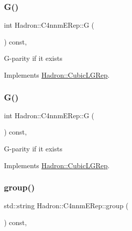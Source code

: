 \subsubsection{\texorpdfstring{G()}{G()}\hspace{0.1cm}{\footnotesize\ttfamily [2/3]}}
{\footnotesize\ttfamily int Hadron\+::\+C4nnm\+E\+Rep\+::G (\begin{DoxyParamCaption}{ }\end{DoxyParamCaption}) const\hspace{0.3cm}{\ttfamily [inline]}, {\ttfamily [virtual]}}

G-\/parity if it exists 

Implements \mbox{\hyperlink{structHadron_1_1CubicLGRep_ace26f7b2d55e3a668a14cb9026da5231}{Hadron\+::\+Cubic\+L\+G\+Rep}}.

\mbox{\label{structHadron_1_1C4nnmERep_aeebb3eed0a37633aded692d6d5929f84}} 
\subsubsection{\texorpdfstring{G()}{G()}\hspace{0.1cm}{\footnotesize\ttfamily [3/3]}}
{\footnotesize\ttfamily int Hadron\+::\+C4nnm\+E\+Rep\+::G (\begin{DoxyParamCaption}{ }\end{DoxyParamCaption}) const\hspace{0.3cm}{\ttfamily [inline]}, {\ttfamily [virtual]}}

G-\/parity if it exists 

Implements \mbox{\hyperlink{structHadron_1_1CubicLGRep_ace26f7b2d55e3a668a14cb9026da5231}{Hadron\+::\+Cubic\+L\+G\+Rep}}.

\mbox{\label{structHadron_1_1C4nnmERep_a45a936a694de501cfdb433b97302755a}} 
\subsubsection{\texorpdfstring{group()}{group()}\hspace{0.1cm}{\footnotesize\ttfamily [1/3]}}
{\footnotesize\ttfamily std\+::string Hadron\+::\+C4nnm\+E\+Rep\+::group (\begin{DoxyParamCaption}{ }\end{DoxyParamCaption}) const\hspace{0.3cm}{\ttfamily [inline]}, {\ttfamily [virtual]}}

